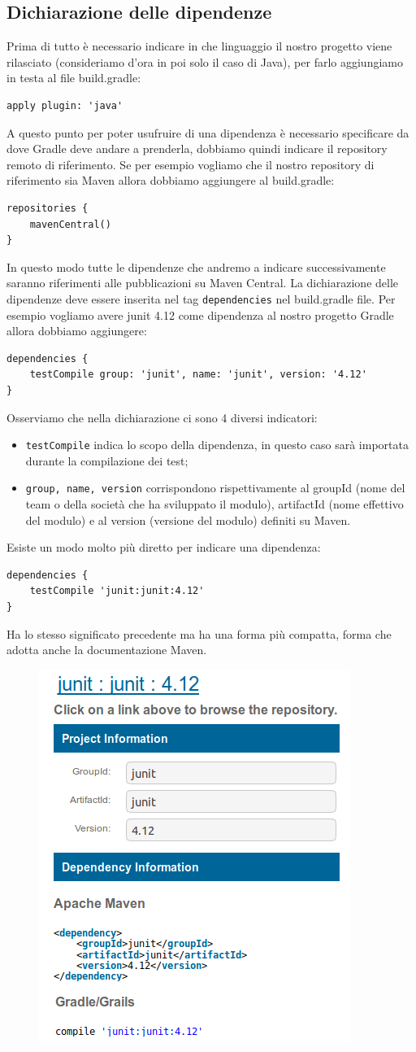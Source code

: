 \subsection{Dichiarazione delle dipendenze}
Prima di tutto è necessario indicare in che linguaggio il nostro progetto viene rilasciato (consideriamo d'ora in poi solo il caso di Java), per farlo aggiungiamo in testa al file build.gradle:
\begin{verbatim}
apply plugin: 'java' \end{verbatim}
A questo punto per poter usufruire di una dipendenza è necessario specificare da dove Gradle deve andare a prenderla, dobbiamo quindi indicare il repository remoto di riferimento. Se per esempio vogliamo che il nostro repository di riferimento sia Maven allora dobbiamo aggiungere al build.gradle:
\begin{verbatim}
repositories {
    mavenCentral()
} \end{verbatim}
In questo modo tutte le dipendenze che andremo a indicare successivamente saranno riferimenti alle pubblicazioni su Maven Central. La dichiarazione delle dipendenze deve essere inserita nel tag \texttt{dependencies} nel build.gradle file. Per esempio vogliamo avere junit 4.12 come dipendenza al nostro progetto Gradle allora dobbiamo aggiungere:
\begin{verbatim}
dependencies {
    testCompile group: 'junit', name: 'junit', version: '4.12' 
} \end{verbatim}
Osserviamo che nella dichiarazione ci sono 4 diversi indicatori:
\begin{itemize}
    \item \texttt{testCompile} indica lo scopo della dipendenza, in questo caso sarà importata durante la compilazione dei test;
    \item \texttt{group, name, version} corrispondono rispettivamente al groupId (nome del team o della società che ha sviluppato il modulo), artifactId (nome effettivo del modulo) e al version (versione del modulo) definiti su Maven.
\end{itemize}
Esiste un modo molto più diretto per indicare una dipendenza:
\begin{verbatim}
dependencies {
    testCompile 'junit:junit:4.12'
} \end{verbatim}
Ha lo stesso significato precedente ma ha una forma più compatta, forma che adotta anche la documentazione Maven.
\begin{figure}[H]
\centering
\includegraphics[width=0.4\linewidth]{HowToUse/3DependencyManagement/javaDep/gradleInMavenRepo.png}
\end{figure} 
